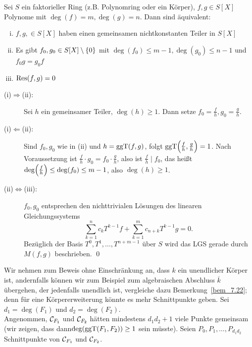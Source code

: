 \begin{satz}
\label{satz_10.8}
	Sei $S$ ein faktorieller Ring (z.B. Polynomring oder ein Körper), $f,g \in S[X]$ Polynome mit $\deg(f)=m, \deg(g)=n$. 
	Dann sind äquivalent: 
	\begin{enumerate}[(i)]
		\item $f,g, \in S[X]$ haben einen gemeinsamen nichtkonstanten Teiler in $S[X]$
		\item Es gibt $f_0,g_0 \in S[X] \setminus \{0\}$ mit $\deg(f_0) \leq m-1, \deg(g_0) \leq n-1$ und $f_0 g= g_0 f$
		\item $\operatorname{Res}(f,g) = 0$
	\end{enumerate}
\end{satz}

	\begin{description}
		\item[(i)$\Rightarrow$(ii):] Sei $h$ ein gemeinsamer Teiler, $\deg(h) \geq 1$. 
		Dann setze $f_0 = \frac{f}{h}, g_0 = \frac{g}{h}$.
		\item[(i)$\Leftarrow$(ii):] Sind $f_0,g_0$ wie in (ii) und $h = \operatorname{ggT}(f,g)$, folgt $\ggT\enb{\frac{f}{h},\frac{g}{h}}=1$. 
		Nach Voraussetzung ist $\frac{f}{h} \cdot g_0 = f_0 \cdot \frac{g}{h}$, also ist $\frac{f}{h} \mid f_0$, das heißt $\deg\enb{\frac{f}{h}} \leq \deg(f_0) \leq m-1$, also $\deg(h) \geq 1$.
		\item[(ii)$\Leftrightarrow$(iii):] $f_0, g_0$ entsprechen den nichttrivialen Lösungen des linearen Gleichungssystems
		\[ \sum_{k=1}^{n} c_k T^{k-1} f + \sum_{k=1}^m c_{n+k} T^{k-1} g = 0. \]
		Bezüglich der Basis $T^0, T^1, \dots, T^{n+m-1}$ über $S$ wird das LGS gerade durch $M(f,g)$ beschrieben. \qed
	\end{description}
	
\begin{bew}
	Wir nehmen zum Beweis ohne Einschränkung an, dass $k$ ein unendlicher Körper ist, andernfalls können wir zum Beispiel zum algebraischen Abschluss $\overline{k}$ übergehen, der jedenfalls unendlich ist, vergleiche dazu Bemerkung~\ref{bem_7.22}; denn für eine Körpererweiterung könnte es mehr Schnittpunkte geben. 
	Sei $d_1 = \deg(F_1)$ und $d_2 = \deg(F_2)$. \\
	Angenommen, $\mathcal{C}_{F_1}$ und $\mathcal{C}_{F_2}$ hätten mindestens $d_1 d_2+1$ viele Punkte gemeinsam (wir zeigen, dass dann\linebreak $\deg(\operatorname{ggT}(F_1,F_2)) \geq 1$ sein müsste). 
	Seien $P_0, P_1, \dots, P_{d_1d_2}$ Schnittpunkte von $\mathcal{C}_{F_1}$ und $\mathcal{C}_{F_2}$.
\end{bew}

